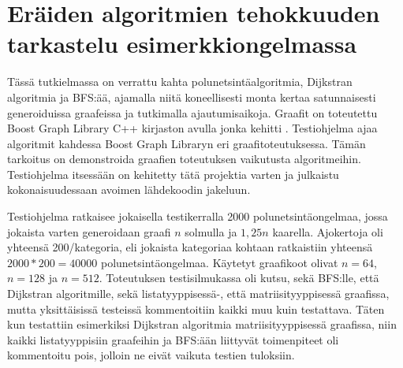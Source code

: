 \chapter{Eräiden algoritmien tehokkuuden tarkastelu esimerkkiongelmassa}\label{benchmarking}

Tässä tutkielmassa on verrattu kahta polunetsintäalgoritmia, Dijkstran 
algoritmia ja BFS:ää, ajamalla niitä koneellisesti monta kertaa satunnaisesti 
generoiduissa graafeissa ja tutkimalla ajautumisaikoja. Graafit on toteutettu
Boost Graph Library C++ kirjaston avulla jonka kehitti \textcite{bgl} . 
Testiohjelma ajaa algoritmit kahdessa Boost Graph Libraryn eri 
graafitoteutuksessa. Tämän tarkoitus on demonstroida graafien toteutuksen 
vaikutusta algoritmeihin. Testiohjelma itsessään on kehitetty tätä 
projektia varten ja julkaistu kokonaisuudessaan avoimen lähdekoodin jakeluun.
\cite{gt2} \par
	Testiohjelma ratkaisee jokaisella testikerralla 2000 
polunetsintäongelmaa, jossa jokaista varten generoidaan graafi $n$ solmulla 
ja $1,25n$ kaarella. Ajokertoja oli yhteensä 200/kategoria, eli jokaista 
kategoriaa kohtaan ratkaistiin yhteensä $2000*200 = 40 000$ 
polunetsintäongelmaa. Käytetyt graafikoot olivat $n=64$, $n=128$ ja $n=512$. 
Toteutuksen testisilmukassa oli kutsu, sekä BFS:lle, että Dijkstran 
algoritmille, sekä listatyyppisessä-, että matriisityyppisessä graafissa, 
mutta yksittäisissä testeissä kommentoitiin kaikki muu kuin testattava. Täten 
kun testattiin esimerkiksi Dijkstran algoritmia matriisityyppisessä graafissa, 
niin kaikki listatyyppisiin graafeihin ja BFS:ään liittyvät toimenpiteet oli 
kommentoitu pois, jolloin ne eivät vaikuta testien tuloksiin.\cite{gt2} \par

